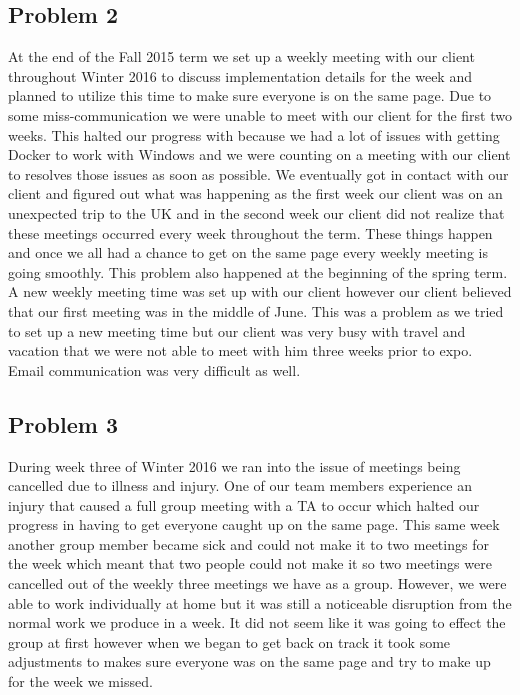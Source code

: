 \documentclass[draftclsnofoot,10pt,onecolumn]{IEEEtran} %
\begin{document}
\begin{enumerate}
\subsection{Problem 2}
At the end of the Fall 2015 term we set up a weekly meeting with our client
throughout Winter 2016 to discuss implementation details for the week and
planned to utilize this time to make sure everyone is on the same page. Due to
some miss-communication we were unable to meet with our client for the first two
weeks. This halted our progress with because we had a lot of issues with getting
Docker to work with Windows and we were counting on a meeting with our client to
resolves those issues as soon as possible. We eventually got in contact with our
client and figured out what was happening as the first week our client was on an
unexpected trip to the UK and in the second week our client did not realize that
these meetings occurred every week throughout the term. These things happen and
once we all had a chance to get on the same page every weekly meeting is going
smoothly. This problem also happened at the beginning of the spring term. A new
weekly meeting time was set up with our client however our client believed that
our first meeting was in the middle of June. This was a problem as we tried to
set up a new meeting time but our client was very busy with travel and vacation
that we were not able to meet with him three weeks prior to expo. Email communication
was very difficult as well.

\subsection{Problem 3}
During week three of Winter 2016 we ran into the issue of meetings being
cancelled due to illness and injury. One of our team members experience an injury
that caused a full group meeting with a TA to occur which halted our progress in
having to get everyone caught up on the same page. This same week another group
member became sick and could not make it to two meetings for the week which
meant that two people could not make it so two meetings were cancelled out of the
weekly three meetings we have as a group. However, we were
able to work individually at home but it was still a noticeable disruption from
the normal work we produce in a week. It did not seem like it was going to
effect the group at first however when we began to get back on track it took
some adjustments to makes sure everyone was on the same page and try to make up
for the week we missed.


\end{enumerate}
\end{document}
